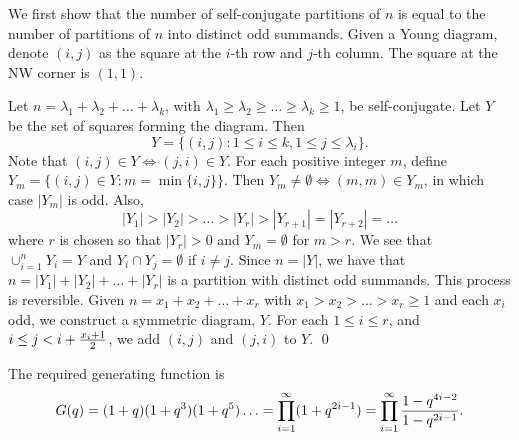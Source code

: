 \documentclass[12pt]{article}
\begin{document}
We first show that the number of self-conjugate partitions of $n$ is equal to the number of partitions of $n$ into distinct odd summands. Given a Young diagram, denote $(i,j)$ as the square at the $i$-th row and $j$-th column. The square at the NW corner is $(1,1)$.

Let $n= \lambda_1+\lambda_2+\hdots+\lambda_k$, with $\lambda_1\ge\lambda_2\ge\hdots\ge\lambda_k\ge1$, be self-conjugate. Let $Y$ be the set of squares forming the diagram. Then $$Y=\{(i,j):1\le i\le k, 1\le j\le \lambda_i\}.$$ Note that $(i,j)\in Y \iff (j,i)\in Y$. For each positive integer $m$, define $Y_m=\{(i,j)\in Y: m= \min\{i,j\}\}$. Then $Y_m\neq\emptyset\iff (m,m)\in Y_m$, in which case $|Y_m|$ is odd. Also, 
$$|Y_1|>|Y_2|>\hdots>|Y_r|>|Y_{r+1}|=|Y_{r+2}|=\hdots$$ where $r$ is chosen so that $|Y_r|>0$ and $Y_m=\emptyset$ for $m>r$. We see that $\cup_{i=1}^n Y_i = Y$ and $Y_i\cap Y_j=\emptyset$ if $i\neq j$. Since $n=|Y|$, we have that $n= |Y_1|+|Y_2|+\hdots+|Y_r|$ is a partition with distinct odd summands. This process is reversible. Given $n=x_1+x_2+\hdots+x_r$ with $x_1>x_2>\hdots>x_r\ge 1$ and each $x_i$ odd, we construct a symmetric diagram, $Y$. For each $1\le i\le r$, and $i\le j< i+{x_i+1\over 2}$, we add $(i,j)$ and $(j,i)$ to $Y$. \qed

The required generating function is $$G(q)=(1+q)(1+q^3)(1+q^5)\hdots=\prod_{i=1}^\infty (1+q^{2i-1})=\prod_{i=1}^\infty {1-q^{4i-2}\over 1-q^{2i-1}}.$$ 
\end{document}
